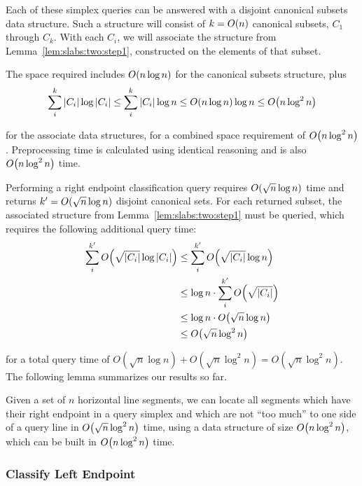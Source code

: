 Each of these simplex queries can be answered with a disjoint canonical subsets data structure. Such a structure will consist of $k = O\!\left(n\right)$ canonical subsets, $C_1$ through $C_k$. With each $C_i$, we will associate the structure from Lemma~\ref{lem:slabs:two:step1}, constructed on the elements of that subset.

The space required includes $O\!\left(n \log{n}\right)$ for the canonical subsets structure, plus
\[
\sum_{i}^{k}{|C_i| \log{|C_i|}} 
\leq \sum_{i}^{k}{|C_i| \log{n}} 
\leq O\!\left(n\log{n}\right) \log{n} 
\leq O\!\left(n \log^2{n}\right)
\]

\noindent for the associate data structures, for a combined space requirement of $O\!\left(n\log^2{n}\right)$. Preprocessing time is calculated using identical reasoning and is also $O\!\left(n \log^2{n}\right)$ time.

Performing a right endpoint classification query requires $O\!\left(\sqrt{n}\log{n}\right)$ time and returns $k' = O\!\left(\sqrt{n}\log{n}\right)$ disjoint canonical sets. For each returned subset, the associated structure from Lemma~\ref{lem:slabs:two:step1} must be queried, which requires the following additional query time:
\[
\begin{split}
\sum_{i}^{k'}{\BigOh{\sqrt{|C_i|}\log{|C_i|}}} 
&\leq \sum_{i}^{k'}{\BigOh{\sqrt{|C_i|} \log{n}}} \\
%
&\leq \log{n} \cdot \sum_{i}^{k'}{\BigOh{\sqrt{|C_i|}}} \\
%
&\leq \log{n} \cdot \BigOh{\sqrt{n}\log{n}} \\
%
&\leq \BigOh{\sqrt{n}\log^2{n}} \\
%
\end{split}
\]

\noindent for a total query time of $O(\sqrt{n}\log{n}) + O(\sqrt{n}\log^2{n}) = O(\sqrt{n}\log^2{n})$. The following lemma summarizes our results so far.

\begin{lemma}
\label{lem:slabs:two:step2}
Given a set of $n$ horizontal line segments, we can locate all segments which have their right endpoint in a query simplex and which are not ``too much'' to one side of a query line in $O\!\left(\sqrt{n}\log^2{n}\right)$ time, using a data structure of size $O\!\left(n\log^2{n}\right)$, which can be built in $O\!\left(n\log^2{n}\right)$ time.
\end{lemma}


\subsubsection{Classify Left Endpoint}

